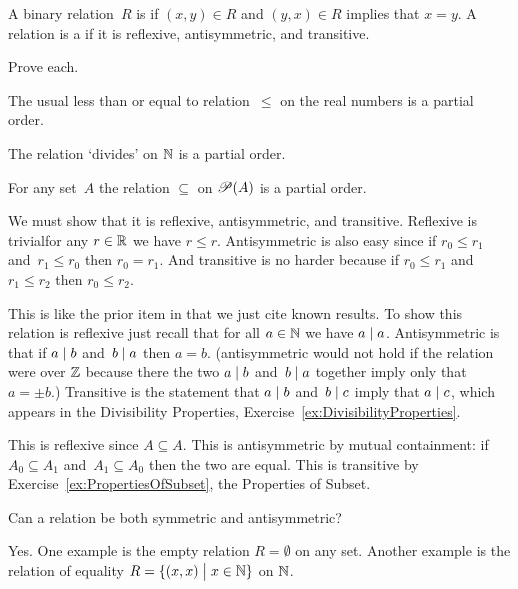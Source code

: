 \documentclass{ibl}  %
\begin{document}
\begin{df}
A binary relation~$R$ is  if
$(x,y)\in R$ and $(y,x)\in R$ implies that $x=y$.
A relation is a  if it is 
reflexive, antisymmetric, and transitive.  
\end{df}

\begin{ex} Prove each.
\begin{exes}
\item The usual less than or equal to relation~$\leq$ on 
the real numbers is a partial order.
\item The relation `divides' on $\mathbb{N}$ is a partial order.
\item For any set~$A$ the relation $\subseteq$ on $\mathscr{P}(A)$ is
a partial order.
\end{exes}
\begin{ans}
\begin{exes}
\item We must show that it is reflexive, antisymmetric, and transitive.
  Reflexive is trivial\Dash for any $r\in\mathbb{R}$ we have $r\leq r$.
  Antisymmetric is also easy since if $r_0\leq r_1$ and~$r_1\leq r_0$
  then $r_0=r_1$.
  And transitive is no harder because if $r_0\leq r_1$ and~$r_1\leq r_2$
  then $r_0\leq r_2$.
\item This is like the prior item in that we just cite known results.
  To show this relation is reflexive just recall that for all $a\in\mathbb{N}$ we have
  $a\mid a$.
  Antisymmetric is that if $a\mid b$ and~$b\mid a$ then
  $a=b$.
  (\remark antisymmetric would not hold if the relation were over
  $\mathbb{Z}$ because there the two $a\mid b$ and~$b\mid a$ together imply
  only that $a=\pm b$.)
  Transitive is the statement that $a\mid b$ and~$b\mid c$ imply
  that $a\mid c$, which appears
  in the Divisibility Properties, Exercise~\ref{ex:DivisibilityProperties}.
\item This is reflexive since $A\subseteq A$.
  This is antisymmetric by mutual containment: 
  if $A_0\subseteq A_1$ and~$A_1\subseteq A_0$ then the two are equal.
  This is transitive by Exercise~\ref{ex:PropertiesOfSubset}, 
  the Properties of Subset.
\end{exes}
\end{ans}
\end{ex}

\begin{ex}
Can a relation be both symmetric and antisymmetric?  
\begin{ans}
Yes.
One example is the empty relation $R=\emptyset$ on any set.
Another example is the relation of equality 
$R=\{(x,x) \bigm| x\in\mathbb{N}\}$ on $\mathbb{N}$.
\end{ans}
\end{ex}







\end{document}
